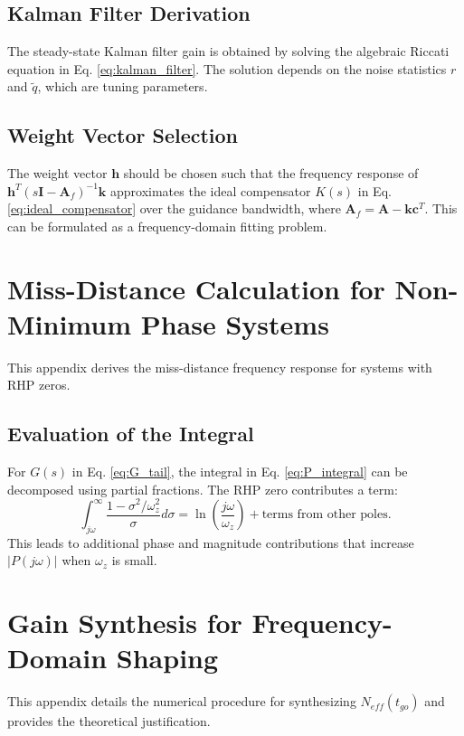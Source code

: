 \documentclass[11pt,a4paper]{article}
\begin{document}
\subsection{Kalman Filter Derivation}
The steady-state Kalman filter gain is obtained by solving the algebraic Riccati equation in Eq. \eqref{eq:kalman_filter}. The solution depends on the noise statistics $r$ and $\tilde{q}$, which are tuning parameters.

\subsection{Weight Vector Selection}
The weight vector $\mathbf{h}$ should be chosen such that the frequency response of $\mathbf{h}^T(s\mathbf{I} - \mathbf{A}_f)^{-1}\mathbf{k}$ approximates the ideal compensator $K(s)$ in Eq. \eqref{eq:ideal_compensator} over the guidance bandwidth, where $\mathbf{A}_f = \mathbf{A} - \mathbf{k}\mathbf{c}^T$. This can be formulated as a frequency-domain fitting problem.

\section{Miss-Distance Calculation for Non-Minimum Phase Systems}
\label{app:miss_calc}
This appendix derives the miss-distance frequency response for systems with RHP zeros.

\subsection{Evaluation of the Integral}
For $G(s)$ in Eq. \eqref{eq:G_tail}, the integral in Eq. \eqref{eq:P_integral} can be decomposed using partial fractions. The RHP zero contributes a term:
\begin{equation}
\int_{j\omega}^{\infty} \frac{1 - \sigma^2/\omega_z^2}{\sigma} d\sigma = \ln\left(\frac{j\omega}{\omega_z}\right) + \text{terms from other poles}.
\end{equation}
This leads to additional phase and magnitude contributions that increase $|P(j\omega)|$ when $\omega_z$ is small.

\section{Gain Synthesis for Frequency-Domain Shaping}
\label{app:gain_synthesis}
This appendix details the numerical procedure for synthesizing $N_{eff}(t_{go})$ and provides the theoretical justification.
\end{document}
